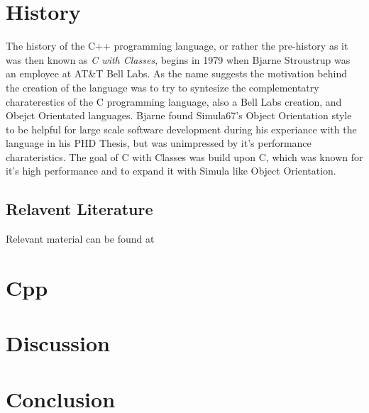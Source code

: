 \documentclass[conference, a4paper]{IEEEtran}
\begin{document}
\section{History}

The history of the C++ programming language, or rather the pre-history as it was then known as \textit{C with Classes}, begins in 1979 when Bjarne Stroustrup was an employee at AT\&T Bell Labs. As the name suggests the motivation behind the creation of the language was to try to syntesize the complementatry charaterestics of the C programming language, also a Bell Labs creation, and Obejct Orientated languages. Bjarne found Simula67's Object Orientation style to be helpful for large scale software development during his experiance with the language in his PHD Thesis, but was unimpressed by it's performance charateristics. The goal of C with Classes was build upon C, which was known for it's high performance and to expand it with Simula like Object Orientation.

\subsection{Relavent Literature}
Relevant material can be found at \cite{cpphome,cpp_1986,cpphistory,cppoverview,cppevolving,alexandrescu2001modern}

\section{Cpp}

\section{Discussion}

\section{Conclusion}



\end{document}
